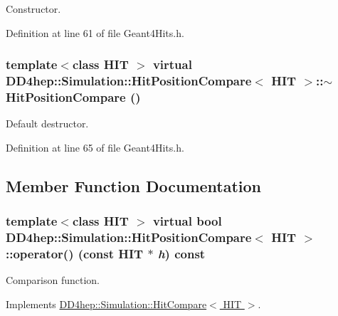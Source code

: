 Constructor. 

Definition at line 61 of file Geant4Hits.h.\hypertarget{struct_d_d4hep_1_1_simulation_1_1_hit_position_compare_a0fa91c4c8ba1e1e4db40ed13c16421e6}{
\subsubsection[{$\sim$HitPositionCompare}]{\setlength{\rightskip}{0pt plus 5cm}template$<$class HIT $>$ virtual {\bf DD4hep::Simulation::HitPositionCompare}$<$ HIT $>$::$\sim${\bf HitPositionCompare} ()}}
\label{struct_d_d4hep_1_1_simulation_1_1_hit_position_compare_a0fa91c4c8ba1e1e4db40ed13c16421e6}


Default destructor. 

Definition at line 65 of file Geant4Hits.h.

\subsection{Member Function Documentation}
\hypertarget{struct_d_d4hep_1_1_simulation_1_1_hit_position_compare_ac7b865b38eddb2c693d8a1eefa10d731}{
\subsubsection[{operator()}]{\setlength{\rightskip}{0pt plus 5cm}template$<$class HIT $>$ virtual bool {\bf DD4hep::Simulation::HitPositionCompare}$<$ HIT $>$::operator() (const HIT $\ast$ {\em h}) const}}
\label{struct_d_d4hep_1_1_simulation_1_1_hit_position_compare_ac7b865b38eddb2c693d8a1eefa10d731}


Comparison function. 

Implements \hyperlink{class_d_d4hep_1_1_simulation_1_1_hit_compare_a025eaffc34d0aad36988120c7d158ec7}{DD4hep::Simulation::HitCompare$<$ HIT $>$}.


